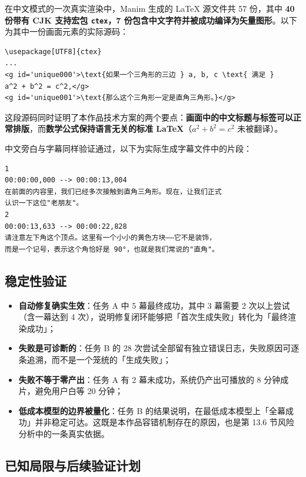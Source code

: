 \documentclass[11pt,a4paper]{ctexart}
\begin{document}
在中文模式的一次真实渲染中，Manim 生成的 LaTeX 源文件共 57 份，其中 \textbf{40 份带有 CJK 支持宏包 \texttt{ctex}，7 份包含中文字符并被成功编译为矢量图形}。以下为其中一份画面元素的实际源码：

\begin{lstlisting}
\usepackage[UTF8]{ctex}
...
<g id='unique000'>\text{如果一个三角形的三边 } a, b, c \text{ 满足 }
a^2 + b^2 = c^2,</g>
<g id='unique001'>\text{那么这个三角形一定是直角三角形。}</g>
\end{lstlisting}

这段源码同时证明了本作品技术方案的两个要点：\textbf{画面中的中文标题与标签可以正常排版}，而\textbf{数学公式保持语言无关的标准 LaTeX}（$a^2+b^2=c^2$ 未被翻译）。

中文旁白与字幕同样验证通过，以下为实际生成字幕文件中的片段：

\begin{lstlisting}
1
00:00:00,000 --> 00:00:13,004
在前面的内容里，我们已经多次接触到直角三角形。现在，让我们正式
认识一下这位"老朋友"。
2
00:00:13,633 --> 00:00:22,828
请注意左下角这个顶点。这里有一个小小的黄色方块——它不是装饰，
而是一个记号，表示这个角恰好是 90°，也就是我们常说的"直角"。
\end{lstlisting}

\subsection{稳定性验证}

\begin{itemize}
  \item \textbf{自动修复确实生效}：任务 A 中 5 幕最终成功，其中 3 幕需要 2 次以上尝试（含一幕达到 4 次），说明修复闭环能够把「首次生成失败」转化为「最终渲染成功」；
  \item \textbf{失败是可诊断的}：任务 B 的 28 次尝试全部留有独立错误日志，失败原因可逐条追溯，而不是一个笼统的「生成失败」；
  \item \textbf{失败不等于零产出}：任务 A 有 2 幕未成功，系统仍产出可播放的 8 分钟成片，避免用户白等 20 分钟；
  \item \textbf{低成本模型的边界被量化}：任务 B 的结果说明，在最低成本模型上「全幕成功」并非稳定可达。这既是本作品容错机制存在的原因，也是第 13.6 节风险分析中的一条真实依据。
\end{itemize}

\subsection{已知局限与后续验证计划}
\end{document}
